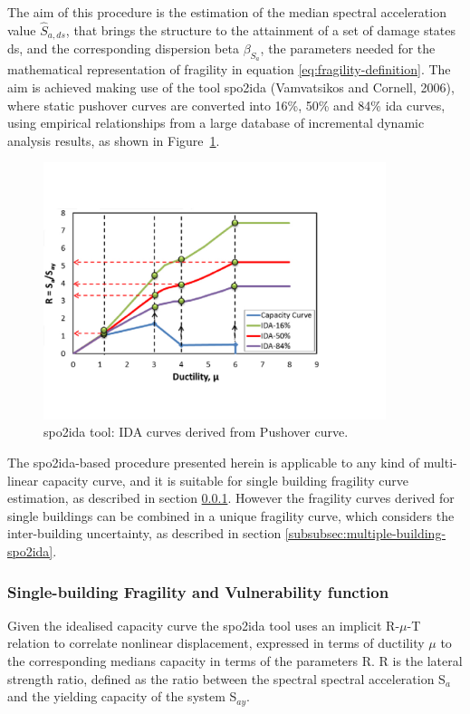 The aim of this procedure is the estimation of the median spectral acceleration value $\hat{S}_{a,ds}$, that brings the structure to the attainment of a set of damage states ds, and the corresponding dispersion beta $\beta_{S_a}$, the parameters needed for the mathematical representation of fragility in equation \ref{eq:fragility-definition}. The aim is achieved making use of the tool spo2ida (Vamvatsikos and Cornell, 2006), where static pushover curves are converted into 16\%, 50\% and 84\% ida curves, using empirical relationships from a large database of incremental dynamic analysis results, as shown in Figure~\ref{fig:spo2ida}.

\begin{figure}[!htbp]
\centering
\includegraphics[width=10cm]{./figures/spo2ida.jpg}
\caption{spo2ida tool: IDA curves derived from Pushover curve.}
\label{fig:spo2ida}
\end{figure}

The spo2ida-based procedure presented herein is applicable to any kind of multi-linear capacity curve, and it is suitable for single building fragility curve estimation, as described in section \ref{subsubsec:single-building-spo2ida}. However the fragility curves derived for single buildings can be combined in a unique fragility curve, which considers the inter-building uncertainty, as described in section \ref{subsubsec:multiple-building-spo2ida}.

\subsubsection{Single-building Fragility and Vulnerability function}
\label{subsubsec:single-building-spo2ida}
Given the idealised capacity curve the spo2ida tool uses an implicit R-$\mu$-T relation to correlate nonlinear displacement, expressed in terms of ductility $\mu$ to the corresponding medians capacity in terms of the parameters R. R is the lateral strength ratio, defined as the ratio between the spectral spectral acceleration S$_a$ and the yielding capacity of the system S$_{ay}$. 

